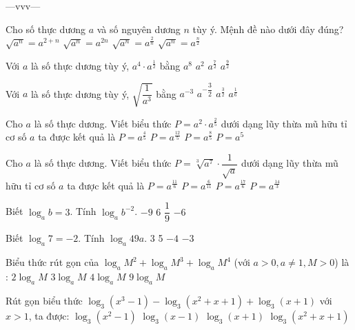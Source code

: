 \begin{name}
	{\tenchude}{\tendethi}{---vvv---}{\thoigian}
\end{name}
\setcounter{ex}{0}\setcounter{bt}{0}
\begin{ex}
	Cho số thực dương $a$ và số nguyên dương $n$ tùy ý. Mệnh đề nào dưới đây đúng?
	\choice
	{$\sqrt{a^n}={a^{2+n}}$}
	{$\sqrt{a^n}={a^{2n}}$}
	{$\sqrt{a^n}={a^{\tfrac{2}{n}}}$}
	{$\sqrt{a^n}={a^{\tfrac{n}{2}}}$}
\end{ex}
\begin{ex}
	Với $a$ là số thực dương tùy ý, $a^4 \cdot {a^{\tfrac{1}{2}}}$ bằng
	\choice
	{$a^8$}
	{$a^2$}
	{${a^{\tfrac{7}{2}}}$}
	{${a^{\tfrac{9}{2}}}$}
\end{ex}
\begin{ex}
	Với $a$ là số thực dương tùy ý, $\sqrt{\dfrac{1}{a^3}}$ bằng
	\choice
	{${a^{-3}}$}
	{${a^{-\dfrac{3}{2}}}$}
	{${a^{\tfrac{3}{2}}}$}
	{${a^{\tfrac{1}{6}}}$}
\end{ex}
\begin{ex}
	Cho $a$ là số thực dương. Viết biểu thức $P=a^2 \cdot {a^{\tfrac{2}{5}}}$ dưới dạng lũy thừa mũ hữu tỉ cơ số $a$ ta được kết quả là
	\choice
	{$P={a^{\tfrac{4}{5}}}$}
	{$P={a^{\tfrac{12}{5}}}$}
	{$P={a^{\tfrac{8}{5}}}$}
	{$P=a^5$}
\end{ex}
\begin{ex}
	Cho $a$ là số thực dương. Viết biểu thức $P=\sqrt[3]{a^7} \cdot \dfrac{1}{\sqrt{a}}$ dưới dạng lũy thừa mũ hữu tỉ cơ số $a$ ta được kết quả là
	\choice
	{$P={a^{\tfrac{11}{6}}}$}
	{$P={a^{\tfrac{6}{11}}}$}
	{$P={a^{\tfrac{17}{6}}}$}
	{$P={a^{\tfrac{14}{3}}}$}
\end{ex}
\begin{ex}
	Biết $\log _ab=3$. Tính $\log _a{b^{-2}}$.
	\choice
	{$-9$}
	{$6$}
	{$\dfrac{1}{9}$}
	{$-6$}
\end{ex}
\begin{ex}
	Biết $\log _a7=-2$. Tính $\log _a49a$.
	\choice
	{3}
	{5}
	{$-4$}
	{$-3$}
\end{ex}
\begin{ex}
	Biểu thức rút gọn của $\log _aM^2+\log _aM^3+\log _aM^4$ (với $a>0,a\ne 1,M>0$) là :
	\choice
	{$2\log _aM$}
	{$3\log _aM$}
	{$4\log _aM$}
	{$9\log _aM$}
\end{ex}
\begin{ex}
	Rút gọn biểu thức $\log _3\left(x^3-1\right)-\log _3\left(x^2+x+1\right)+\log _3(x+1)$ với $x>1$, ta được:
	\choice
	{$\log _3\left(x^2-1\right)$}
	{$\log _3(x-1)$}
	{$\log _3(x+1)$}
	{$\log _3\left(x^2+x+1\right)$}
\end{ex}
